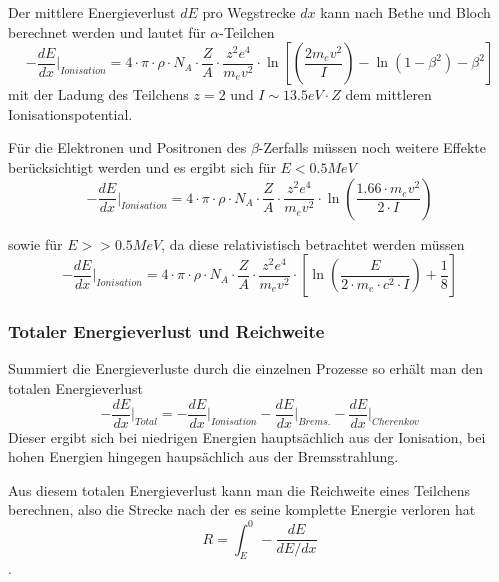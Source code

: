 Der mittlere Energieverlust $dE$ pro Wegstrecke $dx$ kann nach Bethe und Bloch berechnet werden und lautet für $\alpha$-Teilchen
\begin{equation}
 - \frac{dE}{dx} \rvert_{Ionisation} = 4 \cdot \pi \cdot \rho \cdot N_A \cdot \frac{Z}{A} \cdot \frac{z^2e^4}{m_e v^2} \cdot \ln \left[ \left( \frac{2m_ev^2}{I} \right) - \ln \left( 1- \beta^2 \right) - \beta^2 \right]
\end{equation}
mit der Ladung des Teilchens $z = 2$ und $I \sim 13.5 eV \cdot Z$ dem mittleren Ionisationspotential.

Für die Elektronen und Positronen des $\beta$-Zerfalls müssen noch weitere Effekte berücksichtigt werden und es ergibt sich für $ E < 0.5 MeV$
\begin{equation}
 - \frac{dE}{dx} \rvert_{Ionisation} = 4 \cdot \pi \cdot \rho \cdot N_A \cdot \frac{Z}{A} \cdot \frac{z^2e^4}{m_e v^2} \cdot \ln \left( \frac{1.66 \cdot m_ev^2}{2 \cdot I} \right)
\end{equation}

sowie für $ E >> 0.5 MeV$, da diese relativistisch betrachtet werden müssen
\begin{equation}
 - \frac{dE}{dx} \rvert_{Ionisation} = 4 \cdot \pi \cdot \rho \cdot N_A \cdot \frac{Z}{A} \cdot \frac{z^2e^4}{m_e v^2} \cdot  \left[ \ln \left( \frac{E}{2 \cdot m_e \cdot c^2 \cdot I} \right) + \frac{1}{8} \right]
\end{equation}

\subsubsection{Totaler Energieverlust und Reichweite}

Summiert die Energieverluste durch die einzelnen Prozesse so erhält man den totalen Energieverlust
\begin{equation}
 - \frac{dE}{dx} \rvert_{Total} = - \frac{dE}{dx} \rvert_{Ionisation} - \frac{dE}{dx} \rvert_{Brems.} - \frac{dE}{dx} \rvert_{Cherenkov}
\end{equation}
Dieser ergibt sich bei niedrigen Energien hauptsächlich aus der Ionisation, bei hohen Energien hingegen haupsächlich aus der Bremsstrahlung.

Aus diesem totalen Energieverlust kann man die Reichweite eines Teilchens berechnen, also die Strecke nach der es seine komplette Energie verloren hat
\begin{equation}
 R = \int_E^0 - \frac{dE}{dE/dx}
\end{equation}.

